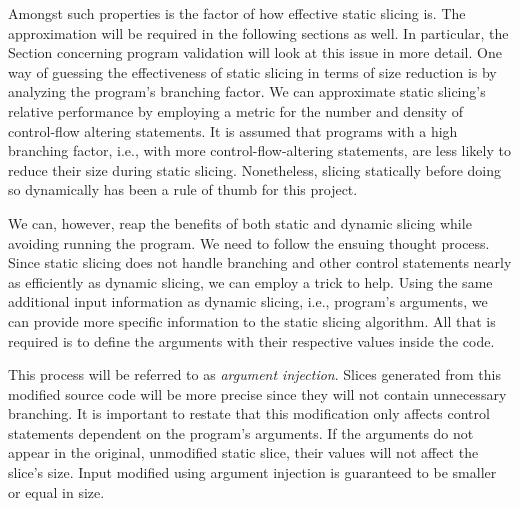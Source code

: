Amongst such properties is the factor of how effective static slicing is.  
The approximation will be required in the following sections as well.  
In particular, the Section concerning program validation will look at this 
issue in more detail.  
One way of guessing the effectiveness of static slicing in terms of size 
reduction is by analyzing the program's branching factor. 
We can approximate static slicing's relative performance by employing 
a metric for the number and density of control-flow altering statements.  
It is assumed that programs with a high branching factor, i.e., with more 
control-flow-altering statements, are less likely to reduce their size 
during static slicing.
Nonetheless, slicing statically before doing so dynamically has been a rule 
of thumb for this project.  

We can, however, reap the benefits of both static and dynamic slicing while 
avoiding running the program. 
We need to follow the ensuing thought process. 
Since static slicing does not handle branching and other control statements 
nearly as efficiently as dynamic slicing, we can employ a trick to help.  
Using the same additional input information as dynamic slicing, i.e., 
program's arguments, we can provide more specific information to the static 
slicing algorithm.  
All that is required is to define the arguments with their respective values 
inside the code. 

This process will be referred to as \emph{argument injection}. 
Slices generated from this modified source code will be more precise since 
they will not contain unnecessary branching.  
It is important to restate that this modification only affects control 
statements dependent on the program's arguments.  
If the arguments do not appear in the original, unmodified static slice, 
their values will not affect the slice's size.  
Input modified using argument injection is guaranteed to be smaller or equal 
in size.

